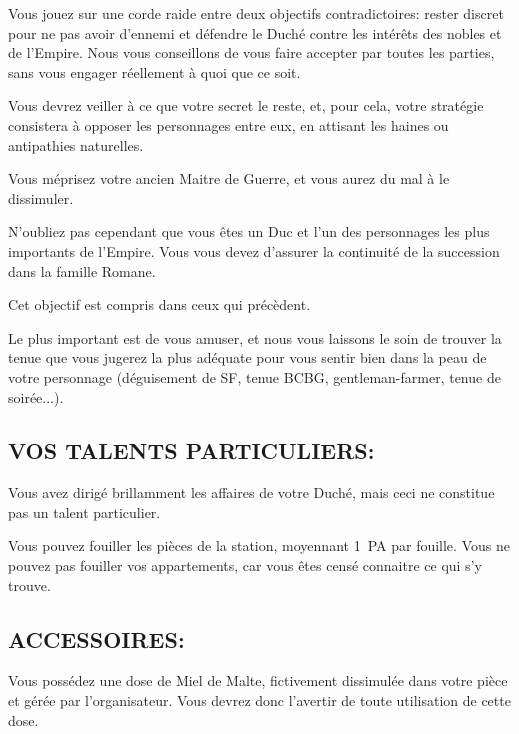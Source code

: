 \documentclass[14pt,twocolumn]{extarticle}
\begin{document}
Vous jouez sur une corde raide entre deux objectifs contradictoires: rester
discret pour ne pas avoir d'ennemi et défendre le Duché contre les intérêts des
nobles et de l'Empire. Nous vous conseillons de vous faire accepter par toutes
les parties, sans vous engager réellement à quoi que ce soit.

Vous devrez veiller à ce que votre secret le reste, et, pour cela, votre
stratégie consistera à opposer les personnages entre eux, en attisant les
haines ou antipathies naturelles.

Vous méprisez votre ancien Maitre de Guerre, et vous aurez du mal à le
dissimuler.

N'oubliez pas cependant que vous êtes un Duc et l'un des personnages les plus
importants de l'Empire. Vous vous devez d'assurer la continuité de la
succession dans la famille Romane.

Cet objectif est compris dans ceux qui précèdent.

Le plus important est de vous amuser, et nous vous laissons le soin de trouver
la tenue que vous jugerez la plus adéquate pour vous sentir bien dans la peau
de votre personnage (déguisement de SF, tenue BCBG, gentleman-farmer, tenue de
soirée...).

\subsection{VOS TALENTS PARTICULIERS:}

Vous avez dirigé brillamment les affaires de votre Duché, mais ceci ne
constitue pas un talent particulier.

Vous pouvez fouiller les pièces de la station, moyennant 1~PA par fouille. Vous
ne pouvez pas fouiller vos appartements, car vous êtes censé connaitre ce qui
s'y trouve.

\subsection{ACCESSOIRES:}

Vous possédez une dose de Miel de Malte, fictivement dissimulée dans votre
pièce et gérée par l'organisateur. Vous devrez donc l'avertir de toute
utilisation de cette dose.
\end{document}
